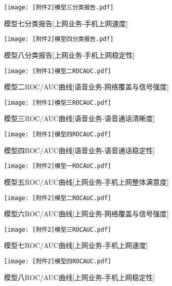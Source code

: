 \documentclass{MathorCupmodeling}
\begin{document}
	\begin{figure}[H]
		\centerline{\texttt{[image: [附件2]模型三分类报告.pdf]}}
		\caption{模型七分类报告[上网业务-手机上网速度]}\label{fig:SeventhModelClassificationReport}
	\end{figure}
	\begin{figure}[H]
		\centerline{\texttt{[image: [附件2]模型四分类报告.pdf]}}
		\caption{模型八分类报告[上网业务-手机上网稳定性]}\label{fig:EighthModelClassificationReport}
	\end{figure}
	\begin{figure}[H]
		\centerline{\texttt{[image: [附件1]模型二ROCAUC.pdf]}}
		\caption{模型二ROC/AUC曲线[语音业务-网络覆盖与信号强度]}\label{fig:SecondModelROCAUC}
	\end{figure}
	\begin{figure}[H]
		\centerline{\texttt{[image: [附件1]模型三ROCAUC.pdf]}}
		\caption{模型三ROC/AUC曲线[语音业务-语音通话清晰度]}\label{fig:ThirdModelROCAUC}
	\end{figure}
	\begin{figure}[H]
		\centerline{\texttt{[image: [附件1]模型四ROCAUC.pdf]}}
		\caption{模型四ROC/AUC曲线[语音业务-语音通话稳定性]}\label{fig:FourthModelROCAUC}
	\end{figure}
	\begin{figure}[H]
		\centerline{\texttt{[image: [附件2]模型一ROCAUC.pdf]}}
		\caption{模型五ROC/AUC曲线[上网业务-手机上网整体满意度]}\label{fig:FifthModelROCAUC}
	\end{figure}
	\begin{figure}[H]
		\centerline{\texttt{[image: [附件2]模型二ROCAUC.pdf]}}
		\caption{模型六ROC/AUC曲线[上网业务-网络覆盖与信号强度]}\label{fig:SixthModelROCAUC}
	\end{figure}
	\begin{figure}[H]
		\centerline{\texttt{[image: [附件2]模型三ROCAUC.pdf]}}
		\caption{模型七ROC/AUC曲线[上网业务-手机上网速度]}\label{fig:SeventhModelROCAUC}
	\end{figure}
	\begin{figure}[H]
		\centerline{\texttt{[image: [附件2]模型四ROCAUC.pdf]}}
		\caption{模型八ROC/AUC曲线[上网业务-手机上网稳定性]}\label{fig:EighthModelROCAUC}
	\end{figure}
\end{document}
